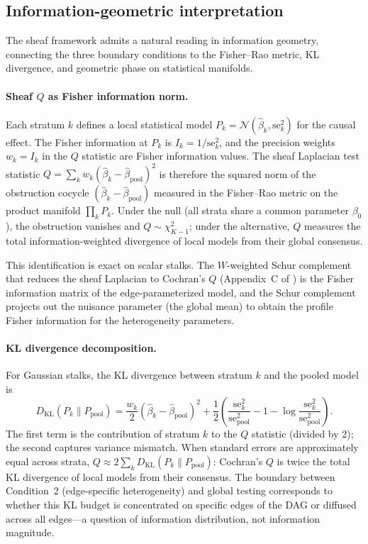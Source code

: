 \documentclass[11pt]{article}
\begin{document}
\subsection{Information-geometric interpretation}
\label{sec:info-geom}

The sheaf framework admits a natural reading in information geometry, connecting the three boundary conditions to the Fisher--Rao metric, KL divergence, and geometric phase on statistical manifolds.

\paragraph{Sheaf $Q$ as Fisher information norm.}
Each stratum $k$ defines a local statistical model $P_k = \mathcal{N}(\hat\beta_k, \mathrm{se}_k^2)$ for the causal effect.
The Fisher information at $P_k$ is $I_k = 1/\mathrm{se}_k^2$, and the precision weights $w_k = I_k$ in the $Q$ statistic are Fisher information values.
The sheaf Laplacian test statistic $Q = \sum_k w_k (\hat\beta_k - \hat\beta_{\mathrm{pool}})^2$ is therefore the squared norm of the obstruction cocycle $(\hat\beta_k - \hat\beta_{\mathrm{pool}})$ measured in the Fisher--Rao metric on the product manifold $\prod_k P_k$.
Under the null (all strata share a common parameter $\beta_0$), the obstruction vanishes and $Q \sim \chi^2_{K-1}$; under the alternative, $Q$ measures the total information-weighted divergence of local models from their global consensus.

This identification is exact on scalar stalks.
The $W$-weighted Schur complement that reduces the sheaf Laplacian to Cochran's $Q$ (Appendix~C of \citealp{tower2026sheaf}) is the Fisher information matrix of the edge-parameterized model, and the Schur complement projects out the nuisance parameter (the global mean) to obtain the profile Fisher information for the heterogeneity parameters.

\paragraph{KL divergence decomposition.}
For Gaussian stalks, the KL divergence between stratum $k$ and the pooled model is
\begin{equation}\label{eq:kl-stratum}
D_{\mathrm{KL}}(P_k \| P_{\mathrm{pool}}) = \frac{w_k}{2}(\hat\beta_k - \hat\beta_{\mathrm{pool}})^2 + \frac{1}{2}\left(\frac{\mathrm{se}_k^2}{\mathrm{se}_{\mathrm{pool}}^2} - 1 - \log \frac{\mathrm{se}_k^2}{\mathrm{se}_{\mathrm{pool}}^2}\right).
\end{equation}
The first term is the contribution of stratum $k$ to the $Q$ statistic (divided by 2); the second captures variance mismatch.
When standard errors are approximately equal across strata, $Q \approx 2 \sum_k D_{\mathrm{KL}}(P_k \| P_{\mathrm{pool}})$: Cochran's $Q$ is twice the total KL divergence of local models from their consensus.
The boundary between Condition~2 (edge-specific heterogeneity) and global testing corresponds to whether this KL budget is concentrated on specific edges of the DAG or diffused across all edges---a question of information distribution, not information magnitude.
\end{document}
